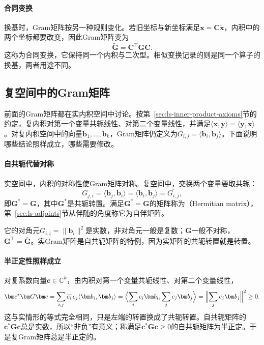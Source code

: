 \paragraph{合同变换} 
换基时，Gram矩阵按另一种规则变化。若旧坐标与新坐标满足$\bm x=\bm C\widetilde{\bm x}$，内积中的两个坐标都要改变，因此Gram矩阵变为
\begin{equation}
 \widetilde{\bm G}=\bm C^\top\bm G\bm C.
 \label{eq:ls-gram-congruence}
\end{equation}
这称为合同变换，它保持同一个内积与二次型。相似变换记录的则是同一个算子的换基，两者用途不同。

\subsection{复空间中的Gram矩阵}
\label{sec:ls-complex-gram}

前面的Gram矩阵都在实内积空间中讨论。按第~\ref{sec:ls-inner-product-axioms}节的约定，复内积对第一个变量共轭线性、对第二个变量线性，并满足$\langle\bm x,\bm y\rangle=\overline{\langle\bm y,\bm x\rangle}$。对复内积空间中的向量$\bm b_1,\ldots,\bm b_k$，Gram矩阵仍定义为$G_{i,j}=\langle\bm b_i,\bm b_j\rangle$。下面说明哪些结论照样成立，哪些需要修改。

\paragraph{自共轭代替对称}
实空间中，内积的对称性使Gram矩阵对称。复空间中，交换两个变量要取共轭：
\[
 G_{j,i}=\langle\bm b_j,\bm b_i\rangle=\overline{\langle\bm b_i,\bm b_j\rangle}=\overline{G_{i,j}},
\]
即$\bm G^*=\bm G$，其中$\bm G^*$是共轭转置。满足$\bm G^*=\bm G$的矩阵称为（Hermitian matrix），第~\ref{sec:ls-adjoints}节从伴随的角度称它为自伴矩阵。

它的对角元$G_{i,i}=\lVert\bm b_i\rVert^2$是实数，非对角元一般是复数；$\bm G$一般不对称，$\bm G^\top=\overline{\bm G}$。实Gram矩阵是自共轭矩阵的特例，因为实矩阵的共轭转置就是转置。

\paragraph{半正定性照样成立}
对复系数向量$\bm c\in\mathbb C^k$，由内积对第一个变量共轭线性、对第二个变量线性，
\[
 \bm c^*\bm G\bm c=\sum_{i,j}\overline{c_i}\,c_j\langle\bm b_i,\bm b_j\rangle
 =\Bigl\langle\sum_ic_i\bm b_i,\sum_jc_j\bm b_j\Bigr\rangle
 =\Bigl\lVert\sum_jc_j\bm b_j\Bigr\rVert^2\geq0 .
\]
这与实情形的等式完全相同，只是左端的转置换成了共轭转置。自共轭矩阵的$\bm c^*\bm G\bm c$总是实数，所以“非负”有意义；称满足$\bm c^*\bm G\bm c\geq0$的自共轭矩阵为半正定。于是复Gram矩阵总是半正定的。

